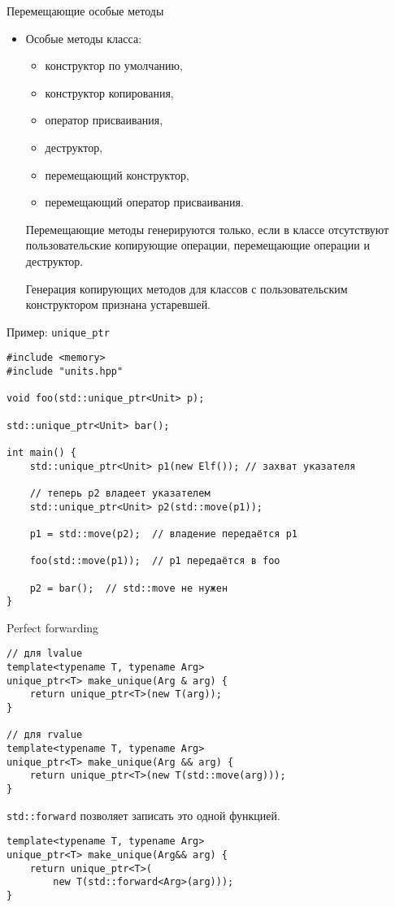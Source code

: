 \documentclass{beamer}
\begin{document}
\begin{frame}[fragile]{Перемещающие особые методы}
    \begin{itemize}
        \item Особые методы класса:
            \begin{itemize}
                \item конструктор по умолчанию,
                \item конструктор копирования,
                \item оператор присваивания,
                \item деструктор,
                \item перемещающий конструктор,
                \item перемещающий оператор присваивания.
             \end{itemize}
                
        \pitem Перемещающие методы генерируются только, если в классе отсутствуют пользовательские копирующие операции, перемещающие операции и деструктор.

        \pitem Генерация копирующих методов для классов с пользовательским конструктором признана устаревшей.
    \end{itemize}
\end{frame}

\begin{frame}[fragile]{Пример: {\tt unique\_ptr}}
    \begin{lstlisting}
#include <memory>
#include "units.hpp"

void foo(std::unique_ptr<Unit> p);

std::unique_ptr<Unit> bar();

int main() {
    std::unique_ptr<Unit> p1(new Elf()); // захват указателя

    // теперь p2 владеет указателем
    std::unique_ptr<Unit> p2(std::move(p1));
    
    p1 = std::move(p2);  // владение передаётся p1
    
    foo(std::move(p1));  // p1 передаётся в foo
    
    p2 = bar();  // std::move не нужен  
} 
    \end{lstlisting}
\end{frame}

\begin{frame}[fragile]{Perfect forwarding}
    \begin{lstlisting}
// для lvalue
template<typename T, typename Arg> 
unique_ptr<T> make_unique(Arg & arg) { 
    return unique_ptr<T>(new T(arg));
} 

// для rvalue
template<typename T, typename Arg> 
unique_ptr<T> make_unique(Arg && arg) { 
    return unique_ptr<T>(new T(std::move(arg)));
} 
    \end{lstlisting}

\texttt{std::forward} позволяет записать это одной функцией.
    \begin{lstlisting}
template<typename T, typename Arg> 
unique_ptr<T> make_unique(Arg&& arg) { 
    return unique_ptr<T>(
        new T(std::forward<Arg>(arg)));
} 
    \end{lstlisting}
\end{frame}
\end{document}
